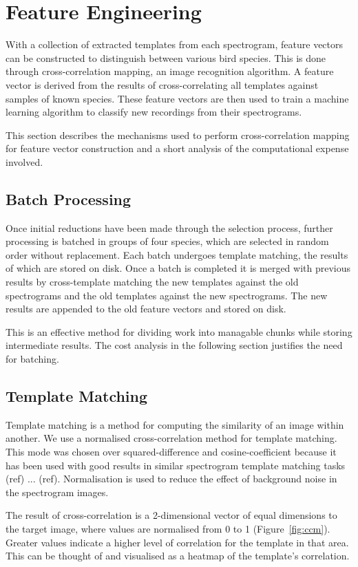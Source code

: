 \section{Feature Engineering}\label{sec:ccm}
With a collection of extracted templates from each spectrogram, feature vectors
can be constructed to distinguish between various bird species.
This is done through cross-correlation mapping, an image recognition algorithm.
A feature vector is derived from the results of cross-correlating all
templates against samples of known species.
These feature vectors are then used to train a machine learning algorithm to
classify new recordings from their spectrograms.

This section describes the mechanisms used to perform cross-correlation mapping
for feature vector construction and a short analysis of the computational
expense involved.

\subsection{Batch Processing}
Once initial reductions have been made through the selection process,
further processing is batched in groups of four species, which are selected in
random order without replacement.
Each batch undergoes template matching, the results of which are stored on disk.
Once a batch is completed it is merged with previous results by cross-template
matching the new templates against the old spectrograms and the old templates
against the new spectrograms.
The new results are appended to the old feature vectors and stored on disk.

This is an effective method for dividing work into managable chunks while storing
intermediate results.
The cost analysis in the following section justifies the need for batching.

\subsection{Template Matching}
Template matching is a method for computing the similarity of an image within
another.
We use a normalised cross-correlation method for template matching.
This mode was chosen over squared-difference and cosine-coefficient because it
has been used with good results in similar spectrogram template matching tasks
(ref) ... (ref).
Normalisation is used to reduce the effect of background noise in the
spectrogram images.

The result of cross-correlation is a 2-dimensional vector of equal dimensions to
the target image, where values are normalised from 0 to 1 (Figure~\ref{fig:ccm}).
Greater values indicate a higher level of correlation for the template in that
area.
This can be thought of and visualised as a heatmap of the template's correlation.


